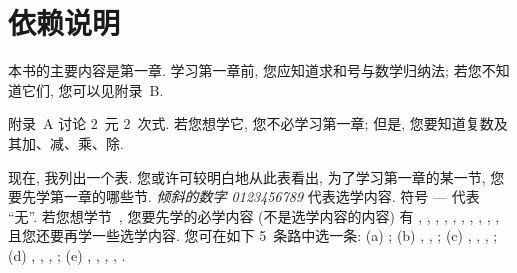\chapter{依赖说明}

本书的主要内容是第一章.
学习第一章前, 您应知道求和号与数学归纳法;
若您不知道它们, 您可以见附录~B.

附录~A 讨论 \(2\)~元 \(2\)~次式.
若您想学它, 您不必学习第一章;
但是, 您要知道复数及其加、减、乘、除.

现在, 我列出一个表.
您或许可较明白地从此表看出,
为了学习第一章的某一节,
您要先学第一章的哪些节.
\textit{倾斜的数字 0123456789}
代表选学内容.
符号 --- 代表 ``无''.
若您想学节~,
您要先学的必学内容 (不是选学内容的内容) 有
,
,
,
,
,
,
,
,
,
,
且您还要再学一些选学内容.
您可在如下 5~条路中选一条:
(a)
;
(b)
,
,
;
(c)
,
,
,
;
(d)
,
,
,
;
(e)
,
,
,
,
.

